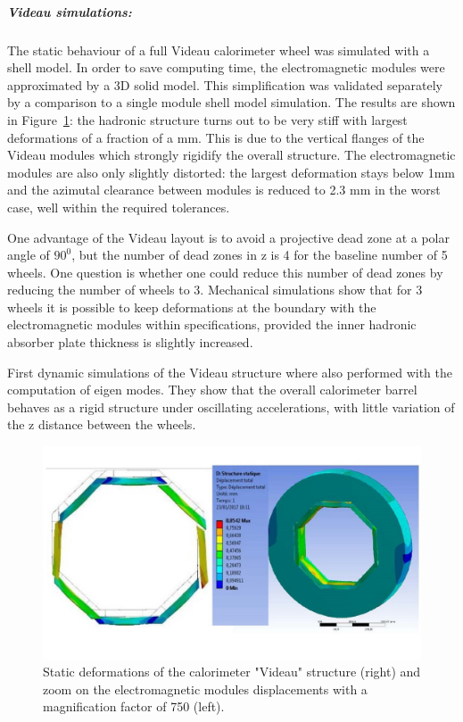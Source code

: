 \subparagraph{\textbf{Videau simulations:}} The static behaviour of a full Videau calorimeter wheel was simulated with a shell model. In order to save computing time, the electromagnetic modules were approximated by a 3D solid model. This simplification was validated separately by a comparison to a single module shell model simulation. The results are shown in Figure~\ref{fig:integration:Videau_deformations}: the hadronic structure turns out to be very stiff with largest deformations of a fraction of a mm. This is due to the vertical flanges of the Videau modules which strongly rigidify the overall structure. The electromagnetic modules are also only slightly distorted: the largest deformation stays below 1mm and the azimutal clearance between modules is reduced to 2.3 mm in the worst case, well within the required tolerances. 

One advantage of the Videau layout is to avoid a projective dead zone at a polar angle of $90^0$, but the number of dead zones in z is 4 for the baseline number of 5 wheels. One question is whether one could reduce this number of dead zones by reducing the number of wheels to 3. Mechanical simulations show that for 3 wheels it is possible to keep deformations at the boundary with the electromagnetic modules within specifications, provided the inner hadronic absorber plate thickness is slightly increased.

First dynamic simulations of the Videau structure where also performed with the computation of eigen modes. They show that the overall calorimeter barrel behaves as a rigid structure under oscillating accelerations, with little variation of the z distance between the wheels. 


\begin{figure}[t!]
\centering
\includegraphics[width=1.0\hsize]{Integration/fig/Videau_deformations.jpg}
\caption{\label{fig:integration:Videau_deformations}Static deformations of the calorimeter "Videau" structure (right) and zoom on the electromagnetic modules displacements with a magnification factor of 750 (left).}
\end{figure}

